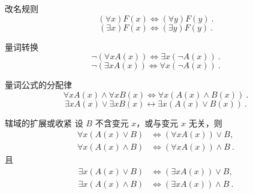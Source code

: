
\begin{theorem}{改名规则}
\begin{equation}
(\forall x) F(x) \Leftrightarrow (\forall y) F(y) ~.
\end{equation}
\begin{equation}
(\exists x) F(x) \Leftrightarrow (\exists y) F(y) ~.
\end{equation}
\end{theorem}
\begin{theorem}{量词转换}
\begin{equation}
\neg (\forall x A(x)) \Leftrightarrow \exists x (\neg A(x)) ~.
\end{equation}
\begin{equation}
\neg (\exists x A(x)) \Leftrightarrow \forall x (\neg A(x)) ~.
\end{equation}
\end{theorem}
\begin{theorem}{量词公式的分配律}
\begin{equation}
\forall x A(x) \land \forall x B(x) \Leftrightarrow \forall x(A(x) \land B(x) )~.
\end{equation}
\begin{equation}
\exists x A(x) \lor \exists x B(x) \leftrightarrow \exists x(A(x) \lor B(x)) ~.
\end{equation}
\end{theorem}

\begin{theorem}{辖域的扩展或收紧}
设 $B$ 不含变元 $x$，或与变元 $x$ 无关，则
\begin{equation}
\begin{aligned}
\forall x (A(x) \lor B) &\Leftrightarrow (\forall x A(x)) \lor B, \\
\forall x (A(x) \land B) &\Leftrightarrow (\forall x A(x)) \land B ~.
\end{aligned}
\end{equation}
且
\begin{equation}
\begin{aligned}
\exists x (A(x) \lor B) &\Leftrightarrow (\exists x A(x)) \lor B, \\
\exists x (A(x) \land B) &\Leftrightarrow (\exists x A(x)) \land B ~.
\end{aligned}
\end{equation}


\end{theorem}




